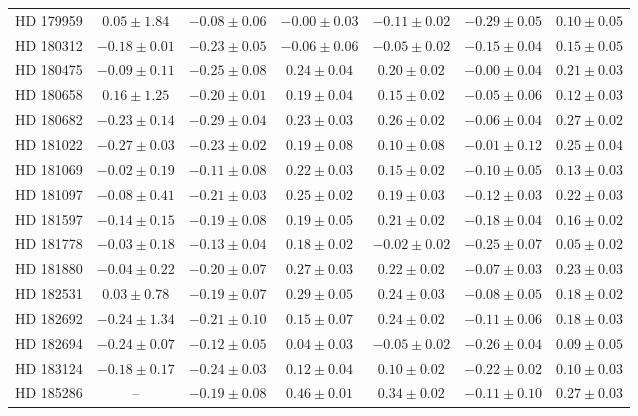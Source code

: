\begin{table*}
\begin{tabular}{ccccccc}
HD 179959 & $0.05 \pm 1.84$ & $-0.08 \pm 0.06$ & $-0.00 \pm 0.03$ & $-0.11 \pm 0.02$ & $-0.29 \pm 0.05$ & $0.10 \pm 0.05$ \\
HD 180312 & $-0.18 \pm 0.01$ & $-0.23 \pm 0.05$ & $-0.06 \pm 0.06$ & $-0.05 \pm 0.02$ & $-0.15 \pm 0.04$ & $0.15 \pm 0.05$ \\
HD 180475 & $-0.09 \pm 0.11$ & $-0.25 \pm 0.08$ & $0.24 \pm 0.04$ & $0.20 \pm 0.02$ & $-0.00 \pm 0.04$ & $0.21 \pm 0.03$ \\
HD 180658 & $0.16 \pm 1.25$ & $-0.20 \pm 0.01$ & $0.19 \pm 0.04$ & $0.15 \pm 0.02$ & $-0.05 \pm 0.06$ & $0.12 \pm 0.03$ \\
HD 180682 & $-0.23 \pm 0.14$ & $-0.29 \pm 0.04$ & $0.23 \pm 0.03$ & $0.26 \pm 0.02$ & $-0.06 \pm 0.04$ & $0.27 \pm 0.02$ \\
HD 181022 & $-0.27 \pm 0.03$ & $-0.23 \pm 0.02$ & $0.19 \pm 0.08$ & $0.10 \pm 0.08$ & $-0.01 \pm 0.12$ & $0.25 \pm 0.04$ \\
HD 181069 & $-0.02 \pm 0.19$ & $-0.11 \pm 0.08$ & $0.22 \pm 0.03$ & $0.15 \pm 0.02$ & $-0.10 \pm 0.05$ & $0.13 \pm 0.03$ \\
HD 181097 & $-0.08 \pm 0.41$ & $-0.21 \pm 0.03$ & $0.25 \pm 0.02$ & $0.19 \pm 0.03$ & $-0.12 \pm 0.03$ & $0.22 \pm 0.03$ \\
HD 181597 & $-0.14 \pm 0.15$ & $-0.19 \pm 0.08$ & $0.19 \pm 0.05$ & $0.21 \pm 0.02$ & $-0.18 \pm 0.04$ & $0.16 \pm 0.02$ \\
HD 181778 & $-0.03 \pm 0.18$ & $-0.13 \pm 0.04$ & $0.18 \pm 0.02$ & $-0.02 \pm 0.02$ & $-0.25 \pm 0.07$ & $0.05 \pm 0.02$ \\
HD 181880 & $-0.04 \pm 0.22$ & $-0.20 \pm 0.07$ & $0.27 \pm 0.03$ & $0.22 \pm 0.02$ & $-0.07 \pm 0.03$ & $0.23 \pm 0.03$ \\
HD 182531 & $0.03 \pm 0.78$ & $-0.19 \pm 0.07$ & $0.29 \pm 0.05$ & $0.24 \pm 0.03$ & $-0.08 \pm 0.05$ & $0.18 \pm 0.02$ \\
HD 182692 & $-0.24 \pm 1.34$ & $-0.21 \pm 0.10$ & $0.15 \pm 0.07$ & $0.24 \pm 0.02$ & $-0.11 \pm 0.06$ & $0.18 \pm 0.03$ \\
HD 182694 & $-0.24 \pm 0.07$ & $-0.12 \pm 0.05$ & $0.04 \pm 0.03$ & $-0.05 \pm 0.02$ & $-0.26 \pm 0.04$ & $0.09 \pm 0.05$ \\
HD 183124 & $-0.18 \pm 0.17$ & $-0.24 \pm 0.03$ & $0.12 \pm 0.04$ & $0.10 \pm 0.02$ & $-0.22 \pm 0.02$ & $0.10 \pm 0.03$ \\
HD 185286 & -- & $-0.19 \pm 0.08$ & $0.46 \pm 0.01$ & $0.34 \pm 0.02$ & $-0.11 \pm 0.10$ & $0.27 \pm 0.03$ \\

\end{tabular}
\end{table*}
